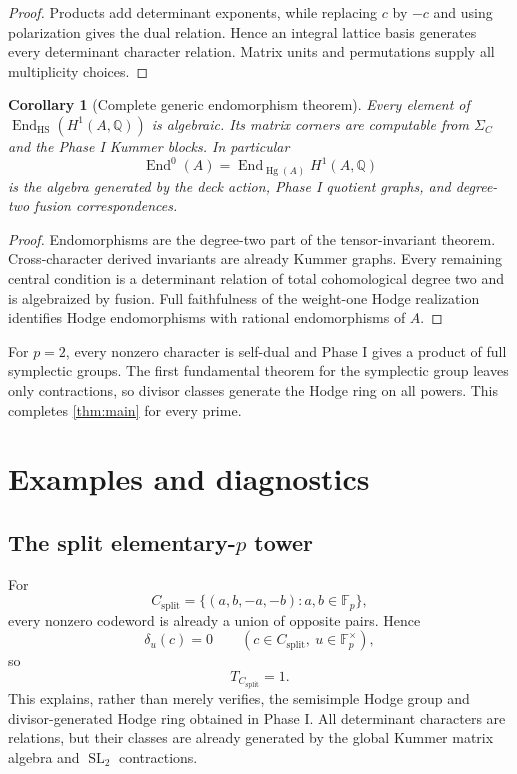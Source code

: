 \documentclass[11pt]{article}
\newtheorem{corollary}[theorem]{Corollary}
\theoremstyle{definition}
\theoremstyle{remark}
\newcommand{\Q}{\mathbb Q}
\newcommand{\F}{\mathbb F}
\newcommand{\Hg}{\operatorname{Hg}}
\newcommand{\End}{\operatorname{End}}
\newcommand{\SL}{\operatorname{SL}}
\begin{document}
\begin{proof}
Products add determinant exponents, while replacing $c$ by $-c$ and using polarization gives the dual relation.  Hence an integral lattice basis generates every determinant character relation.  Matrix units and permutations supply all multiplicity choices.
\end{proof}

\begin{corollary}[Complete generic endomorphism theorem]\label{cor:endomorphisms}
Every element of $\End_{\mathrm{HS}}(H^1(A,\Q))$ is algebraic.  Its matrix corners are computable from $\Sigma_C$ and the Phase I Kummer blocks.  In particular
\[
 \End^0(A)=\End_{\Hg(A)}H^1(A,\Q)
\]
is the algebra generated by the deck action, Phase I quotient graphs, and degree-two fusion correspondences.
\end{corollary}

\begin{proof}
Endomorphisms are the degree-two part of the tensor-invariant theorem.  Cross-character derived invariants are already Kummer graphs.  Every remaining central condition is a determinant relation of total cohomological degree two and is algebraized by fusion.  Full faithfulness of the weight-one Hodge realization identifies Hodge endomorphisms with rational endomorphisms of $A$.
\end{proof}

For $p=2$, every nonzero character is self-dual and Phase I gives a product of full symplectic groups.  The first fundamental theorem for the symplectic group leaves only contractions, so divisor classes generate the Hodge ring on all powers.  This completes \cref{thm:main} for every prime.

\section{Examples and diagnostics}\label{sec:examples}

\subsection{The split elementary-\texorpdfstring{$p$}{p} tower}

For
\[
 C_{\mathrm{split}}=
 \{(a,b,-a,-b):a,b\in\F_p\},
\]
every nonzero codeword is already a union of opposite pairs.  Hence
\[
 \delta_u(c)=0
 \qquad(c\in C_{\mathrm{split}},\ u\in\F_p^\times),
\]
so
\begin{equation}\label{eq:split-torus-zero}
 T_{C_{\mathrm{split}}}=1.
\end{equation}
This explains, rather than merely verifies, the semisimple Hodge group and divisor-generated Hodge ring obtained in Phase I.  All determinant characters are relations, but their classes are already generated by the global Kummer matrix algebra and $\SL_2$ contractions.
\end{document}
